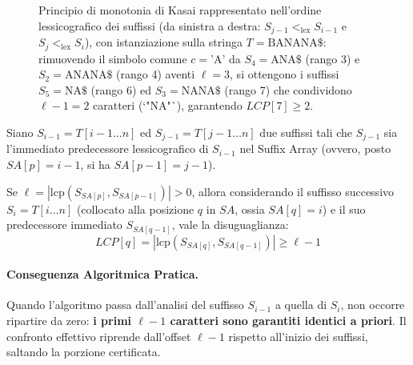 \begin{figure}[H]
{%
}
\caption{Principio di monotonia di Kasai rappresentato nell'ordine lessicografico dei suffissi (da sinistra a destra: $S_{j-1} <_{\text{lex}} S_{i-1}$ e $S_j <_{\text{lex}} S_i$), con istanziazione sulla stringa $T = \text{BANANA}\$$: rimuovendo il simbolo comune $c = \text{'A'}$ da $S_4 = \text{ANA}\$$ (rango 3) e $S_2 = \text{ANANA}\$$ (rango 4) aventi $\ell = 3$, si ottengono i suffissi $S_5 = \text{NA}\$$ (rango 6) ed $S_3 = \text{NANA}\$$ (rango 7) che condividono $\ell - 1 = 2$ caratteri (`"NA"`), garantendo $LCP[7] \ge 2$.}
\label{fig:kasai-monotonicity-principle}
\end{figure}

\begin{theorem}
\label{thm:fondamentale-kasai}
Siano $S_{i-1} = T[i-1 \dots n]$ ed $S_{j-1} = T[j-1 \dots n]$ due suffissi tali che $S_{j-1}$ sia l'immediato predecessore lessicografico di $S_{i-1}$ nel Suffix Array (ovvero, posto $SA[p] = i-1$, si ha $SA[p-1] = j-1$).

Se $\ell = |\text{lcp}(S_{SA[p]}, S_{SA[p-1]})| > 0$, allora considerando il suffisso successivo $S_i = T[i \dots n]$ (collocato alla posizione $q$ in $SA$, ossia $SA[q] = i$) e il suo predecessore immediato $S_{SA[q-1]}$, vale la disuguaglianza:
\begin{equation}
  LCP[q] = |\text{lcp}(S_{SA[q]}, S_{SA[q-1]})| \ge \ell - 1
\end{equation}
\end{theorem}

\paragraph{Conseguenza Algoritmica Pratica.}
Quando l'algoritmo passa dall'analisi del suffisso $S_{i-1}$ a quella di $S_i$, non occorre ripartire da zero: \textbf{i primi $\ell - 1$ caratteri sono garantiti identici a priori}. Il confronto effettivo riprende dall'offset $\ell - 1$ rispetto all'inizio dei suffissi, saltando la porzione certificata.

